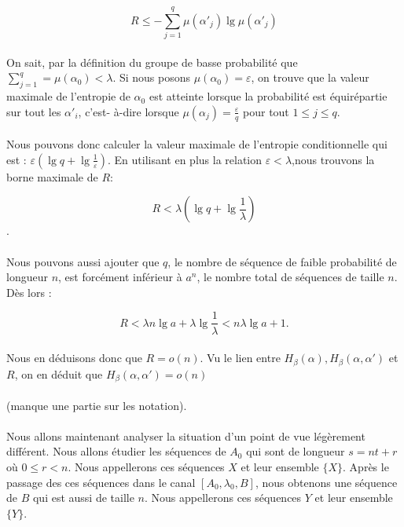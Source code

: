 	\[R \le -\sum_{j=1}^q\mu(\alpha'_j)\lg\mu(\alpha'_j)\]
	
	\paragraph{}
	On sait, par la définition du groupe de basse probabilité que $\sum_{j=1}^q =\mu(\alpha_0) < \lambda$. Si nous posons $\mu(\alpha_0)=\varepsilon$,
	on trouve que la valeur maximale de l'entropie de $\alpha_0$ est atteinte lorsque la probabilité est équirépartie sur tout les $\alpha'_i$, c'est-
	à-dire lorsque $\mu(\alpha_j)=\frac{\varepsilon}{q}$ pour tout $1\le j\le q$.
	
	\paragraph{}
	Nous pouvons donc calculer la valeur maximale de l'entropie conditionnelle qui est : $\varepsilon \left(\lg q+\lg\frac{1}{\varepsilon}\right)$.
	En utilisant en plus la relation $\varepsilon < \lambda$,nous trouvons la borne maximale de $R$:
	
	\[R<\lambda\left(\lg q+\lg\frac{1}{\lambda}\right)\].
	
	\paragraph{}
	Nous pouvons aussi ajouter que $q$, le nombre de séquence de faible probabilité de longueur $n$, est forcément inférieur à $a^n$, le nombre total de séquences de taille $n$.
	Dès lors :
	
	\[R<\lambda n\lg a +\lambda \lg \frac{1}{\lambda}<n\lambda\lg a+1.\]
	
	\paragraph{}
	Nous en déduisons donc que $R=o(n)$. Vu le lien entre $H_\beta(\alpha),H_\beta(\alpha,\alpha')$ et $R$, on en déduit que $H_\beta(\alpha,\alpha')=o(n)$
	
	\paragraph{}
	(manque une partie sur les notation).
	
	\paragraph{}
	Nous allons maintenant analyser la situation d'un point de vue légèrement différent. Nous allons étudier les séquences de $A_0$ qui sont de longueur $s = nt+r$
	où $0\le r < n$. Nous appellerons ces séquences $X$ et leur ensemble $\{X\}$. Après le passage des ces séquences dans le canal $[A_0,\lambda_0,B]$, nous obtenons
	une séquence de $B$ qui est aussi de taille $n$. Nous appellerons ces séquences $Y$ et leur ensemble $\{Y\}$.
	
